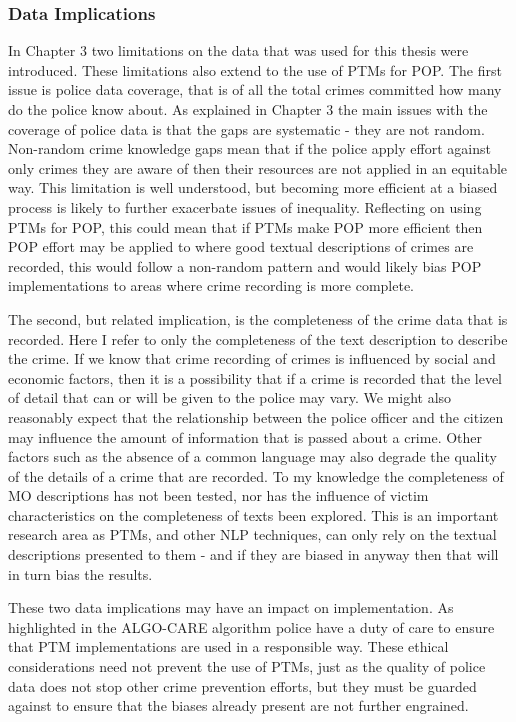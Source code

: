 \subsubsection{Data Implications} In Chapter 3 two limitations on the data that was used for this thesis were introduced. These limitations also extend to the use of PTMs for POP. The first issue is police data coverage, that is of all the total crimes committed how many do the police know about. As explained in Chapter 3 the main issues with the coverage of police data is that the gaps are systematic - they are not random. Non-random crime knowledge gaps mean that if the police apply effort against only crimes they are aware of then their resources are not applied in an equitable way. This limitation is well understood, but becoming more efficient at a biased process is likely to further exacerbate issues of inequality. Reflecting on using PTMs for POP, this could mean that if PTMs make POP more efficient then POP effort may be applied to where good textual descriptions of crimes are recorded, this would follow a non-random pattern and would likely bias POP implementations to areas where crime recording is more complete.

The second, but related implication, is the completeness of the crime data that is recorded. Here I refer to only the completeness of the text description to describe the crime. If we know that crime recording of crimes is influenced by social and economic factors, then it is a possibility that if a crime is recorded that the level of detail that can or will be given to the police may vary. We might also reasonably expect that the relationship between the police officer and the citizen may influence the amount of information that is passed about a crime. Other factors such as the absence of a common language may also degrade the quality of the details of a crime that are recorded. To my knowledge the completeness of MO descriptions has not been tested, nor has the influence of victim characteristics on the completeness of texts been explored. This is an important research area as PTMs, and other NLP techniques, can only rely on the textual descriptions presented to them - and if they are biased in anyway then that will in turn bias the results.

These two data implications may have an impact on implementation. As highlighted in the ALGO-CARE algorithm police have a duty of care to ensure that PTM implementations are used in a responsible way. These ethical considerations need not prevent the use of PTMs, just as the quality of police data does not stop other crime prevention efforts,  but they must be guarded against to ensure that the biases already present are not further engrained.  

